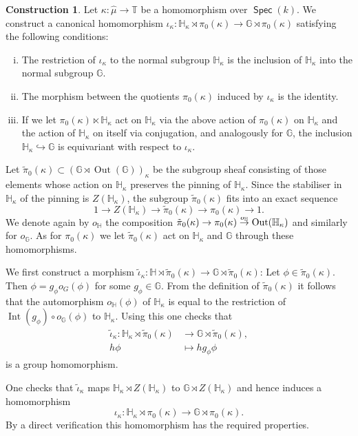 \documentclass{article}
\DeclareMathOperator{\Inn}{Int}
\newcommand\toover[1]{\mathrel{\smash{\overset{#1}{\to}}}}
\DeclareMathOperator{\Spec}{\mathsf{Spec}}
\newcommand{\BG}{{\mathbb{G}}}
\newcommand{\BH}{{\mathbb{H}}}
\newcommand{\BT}{{\mathbb{T}}}
\DeclareMathOperator{\Out}{Out}
\let\into\hookrightarrow
\theoremstyle{definition}
\newtheorem{construction}[definition]{Construction}
\theoremstyle{plain}
\begin{document}
\begin{construction} \label{ikCons}
  Let $\kappa \colon \hat \mu \to  \BT$ be a homomorphism over $\Spec(k)$. We construct a canonical homomorphism $\iota_\kappa\colon \BH_\kappa \rtimes \pi_0(\kappa)  \to \BG \rtimes \pi_0(\kappa)$ satisfying the following conditions:
  \begin{enumerate}[(i)]
  \item The restriction of $\iota_\kappa$ to the normal subgroup $\BH_\kappa$ is the inclusion of $\BH_\kappa$ into the normal subgroup $\BG$.
  \item The morphism between the quotients $\pi_0(\kappa)$ induced by $\iota_\kappa$ is the identity. 
  \item If we let $\pi_0(\kappa) \ltimes \BH_\kappa$ act on $\BH_\kappa$ via the above action of $\pi_0(\kappa)$ on $\BH_\kappa$ and the action of $\BH_\kappa$ on itself via conjugation, and analogously for $\BG$, the inclusion $\BH_\kappa \into \BG$ is equivariant with respect to $\iota_\kappa$.
  \end{enumerate}

Let $\tilde \pi_0(\kappa) \subset (\BG \rtimes \Out(\BG))_\kappa$ be the subgroup sheaf consisting of those elements whose action on $\BH_\kappa$ preserves the pinning of $\BH_\kappa$. Since the stabiliser in $\BH_\kappa$ of the pinning is $Z(\BH_\kappa)$, the subgroup $\tilde\pi_0(\kappa)$ fits into an exact sequence 
\begin{equation*}
  1 \to Z(\BH_\kappa) \to \tilde \pi_0(\kappa) \to \pi_0(\kappa) \to 1.
\end{equation*}
We denote again by $o_\BH$ the composition $\tilde\pi_0(\kappa) \to \pi_0(\kappa) \toover{o_\BH} \Out(\BH_\kappa)$ and similarly for $o_\BG$. As for $\pi_0(\kappa)$ we let $\tilde\pi_0(\kappa)$ act on $\BH_\kappa$ and $\BG$ through these homomorphisms.

We first construct a morphism $\tilde\iota_\kappa\colon \BH \rtimes \tilde\pi_0(\kappa) \to \BG \rtimes \tilde\pi_0(\kappa)$: Let $\phi \in \tilde\pi_0(\kappa)$. Then $\phi=g_\phi o_G(\phi)$ for some $g_\phi \in \BG$. From the definition of $\tilde\pi_0(\kappa)$ it follows that the automorphism $o_\BH(\phi)$ of $\BH_\kappa$ is equal to the restriction of $\Inn(g_\phi)\circ o_\BG(\phi)$ to $\BH_\kappa$. Using this one checks that 
\begin{align*}
\tilde\iota_\kappa\colon \BH_\kappa \rtimes \tilde\pi_0(\kappa) &\to \BG \rtimes \tilde\pi_0(\kappa),\\ h \phi &\mapsto h g_\phi \phi  
\end{align*}
 is a group homomorphism.

One checks that $\tilde\iota_\kappa$ maps $\BH_\kappa \rtimes Z(\BH_\kappa)$ to $\BG \rtimes Z(\BH_\kappa)$ and hence induces a homomorphism $$\iota_\kappa\colon \BH_\kappa \rtimes \pi_0(\kappa)  \to \BG \rtimes \pi_0(\kappa).$$ By a direct verification this homomorphism has the required properties.
\end{construction}
\end{document}
